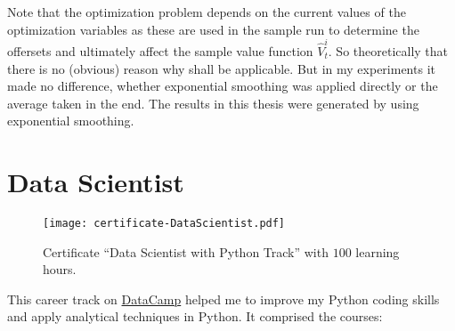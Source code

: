 \begin{remark}
	Note that the optimization problem depends on the current values of the optimization variables as these are used in the sample run to determine the offersets and ultimately affect the sample value function $\hat{V}_t^i$. So theoretically that there is no (obvious) reason why  shall be applicable. But in my experiments it made no difference, whether exponential smoothing was applied directly or the average taken in the end. The results in this thesis were generated by using exponential smoothing.
\end{remark}

\chapter{Data Scientist}

\begin{figure}[H]
	\centering
	\texttt{[image: certificate-DataScientist.pdf]}
	\caption[Certificate \enquote{Data Scientist with Python Track}]{Certificate \enquote{Data Scientist with Python Track} with $100$ learning hours.}
\end{figure}

This career track on \href{https://www.datacamp.com/tracks/data-scientist-with-python}{DataCamp} helped me to improve my Python coding skills and apply analytical techniques in Python. It comprised the courses:

